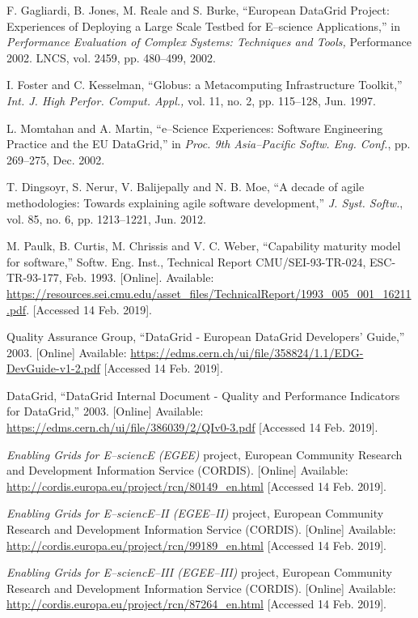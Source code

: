 \begin{thebibliography}{1}
F. Gagliardi, B. Jones, M. Reale and S. Burke,
``European DataGrid Project: Experiences of Deploying a Large Scale Testbed for E--science Applications,''
in \emph{Performance Evaluation of Complex Systems: Techniques and Tools,}
Performance 2002. LNCS, vol. 2459, pp. 480--499, 2002.

I. Foster and C. Kesselman,
``Globus: a Metacomputing Infrastructure Toolkit,''
\emph{Int. J. High Perfor. Comput. Appl.,}
vol. 11, no. 2, pp. 115--128, Jun. 1997.

L. Momtahan and A. Martin,
``e--Science Experiences: Software Engineering Practice and the EU DataGrid,''
in \emph{Proc. 9th Asia--Pacific Softw. Eng. Conf.},
pp. 269--275, Dec. 2002.

T. Dingsoyr, S. Nerur, V. Balijepally and N. B. Moe,
``A decade of agile methodologies: Towards explaining agile software development,''
\emph{J. Syst. Softw.},
vol. 85, no. 6, pp. 1213--1221, Jun. 2012.


M. Paulk, B. Curtis, M. Chrissis and V. C. Weber,
``Capability maturity model for software,''
Softw. Eng. Inst.,
Technical Report CMU/SEI-93-TR-024, ESC-TR-93-177, Feb. 1993.
[Online]. Available: \url{https://resources.sei.cmu.edu/asset_files/TechnicalReport/1993_005_001_16211.pdf}.
[Accessed 14 Feb. 2019].

Quality Assurance Group, ``DataGrid - European DataGrid Developers' Guide,''
2003.
[Online] Available: \url{https://edms.cern.ch/ui/file/358824/1.1/EDG-DevGuide-v1-2.pdf}
[Accessed 14 Feb. 2019].

DataGrid, ``DataGrid Internal Document - Quality and Performance Indicators for DataGrid,''
2003.
[Online] Available: \url{https://edms.cern.ch/ui/file/386039/2/QIv0-3.pdf}
[Accessed 14 Feb. 2019].

\emph{Enabling Grids for E--sciencE (EGEE)} project, European Community Research and
Development Information Service (CORDIS).
[Online] Available: \url{http://cordis.europa.eu/project/rcn/80149_en.html}
[Accessed 14 Feb. 2019].

\emph{Enabling Grids for E--sciencE--II (EGEE--II)} project, European Community Research and
Development Information Service (CORDIS).
[Online] Available: \url{http://cordis.europa.eu/project/rcn/99189_en.html}
[Accessed 14 Feb. 2019].

\emph{Enabling Grids for E--sciencE--III (EGEE--III)} project, European Community
Research and Development Information Service (CORDIS).
[Online] Available: \url{http://cordis.europa.eu/project/rcn/87264_en.html}
[Accessed 14 Feb. 2019].


\end{thebibliography}

